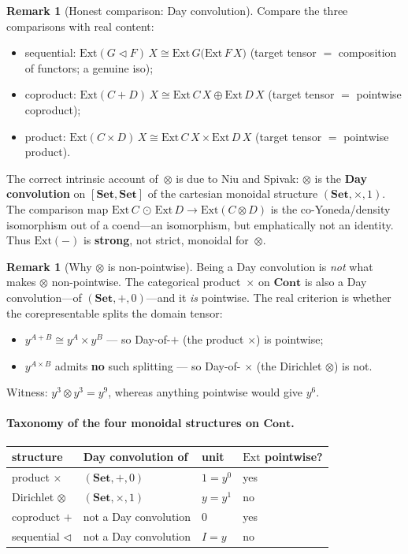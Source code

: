 \documentclass[11pt,a4paper]{article}
\theoremstyle{plain}
\theoremstyle{definition}
\newtheorem{remark}[theorem]{Remark}
\newcommand{\Cont}{\mathbf{Cont}}
\newcommand{\Ext}{\mathrm{Ext}}
\newcommand{\seq}{\mathbin{\triangleleft}}
\newcommand{\Dir}{\mathbin{\otimes}}
\begin{document}
\begin{remark}[Honest comparison: Day convolution]
Compare the three comparisons with real content:
\begin{itemize}
  \item sequential:
        $\Ext(G \seq F)\,X \cong \Ext\,G\bigl(\Ext\,F\,X\bigr)$
        (target tensor $=$ composition of functors; a genuine iso);
  \item coproduct:
        $\Ext(C+D)\,X \cong \Ext\,C\,X \oplus \Ext\,D\,X$
        (target tensor $=$ pointwise coproduct);
  \item product:
        $\Ext(C \times D)\,X \cong \Ext\,C\,X \times \Ext\,D\,X$
        (target tensor $=$ pointwise product).
\end{itemize}
The correct intrinsic account of~$\Dir$ is due to Niu and Spivak:
$\Dir$ is the \textbf{Day convolution} on $[\mathbf{Set},\mathbf{Set}]$ of
the cartesian monoidal structure $(\mathbf{Set}, \times, 1)$. The
comparison map $\Ext\,C \,\odot\, \Ext\,D \to \Ext(C \Dir D)$ is the
co-Yoneda/density isomorphism out of a coend---an isomorphism, but
emphatically not an identity. Thus $\Ext(-)$ is \textbf{strong}, not
strict, monoidal for~$\Dir$.
\end{remark}

\begin{remark}[Why $\Dir$ is non-pointwise]
Being a Day convolution is \emph{not} what makes $\Dir$ non-pointwise.
The categorical product~$\times$ on $\Cont$ is also a Day convolution---of
$(\mathbf{Set}, +, 0)$---and it \emph{is} pointwise. The real criterion is
whether the corepresentable splits the domain tensor:
\begin{itemize}
  \item $y^{A+B} \cong y^A \times y^B$ --- so Day-of-$+$ (the product
        $\times$) is pointwise;
  \item $y^{A \times B}$ admits \textbf{no} such splitting --- so Day-of-
        $\times$ (the Dirichlet $\Dir$) is not.
\end{itemize}
Witness: $y^3 \Dir y^3 = y^9$, whereas anything pointwise would give
$y^6$.
\end{remark}

\paragraph{Taxonomy of the four monoidal structures on $\Cont$.}
\begin{center}
\begin{tabular}{llll}
structure & Day convolution of & unit & $\Ext$ pointwise? \\
\hline
product $\times$ & $(\mathbf{Set}, +, 0)$ & $1 = y^0$ & yes \\
Dirichlet $\Dir$ & $(\mathbf{Set}, \times, 1)$ & $y = y^1$ & no \\
coproduct $+$ & not a Day convolution & $0$ & yes \\
sequential $\seq$ & not a Day convolution & $I = y$ & no
\end{tabular}
\end{center}
\end{document}
